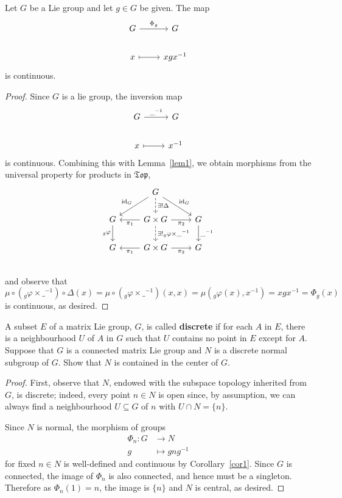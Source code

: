 \documentclass[10pt]{amsart}
\begin{document}
\begin{cor}\label{cor1}
  Let $G$ be a Lie group and let $g \in G$ be given.
  The map
  $$\begin{tikzcd}
    G \arrow{r}{\Phi_g} &G\\
    x \arrow[mapsto]{r}& xgx^{-1}
  \end{tikzcd}$$
  is continuous.

  \begin{proof}
    Since $G$ is a lie group, the inversion map
    $$\begin{tikzcd}
      G \arrow{r}{\_^{-1}} &G\\
      x \arrow[mapsto]{r} & x^{-1} 
    \end{tikzcd}$$
    is continuous.
    Combining this with Lemma~\ref{lem1}, we obtain morphisms from the universal property for products in $\mathfrak{Top}$,
    $$\begin{tikzcd}
      & G\arrow[swap]{ld}{\operatorname{id}_G}\arrow{rd}{\operatorname{id}_G}\arrow[dashed]{d}{\exists !\Delta}\\
      G\arrow[swap]{d}{_g\varphi} & \arrow{l}{\pi_1} G \times G \arrow[dashed]{d}{\exists !_g\varphi \times \_^{-1}} \arrow[swap]{r}{\pi_2} & G\arrow{d}{\_^{-1}}\\
      G & \arrow{l}{\pi_1} G \times G \arrow[swap]{r}{\pi_2} & G\\
    \end{tikzcd}$$
    and observe that 
    $$\mu \circ \left(_g\varphi \times \_^{-1}\right) \circ \Delta(x)
    = \mu \circ \left(_g\varphi \times \_^{-1}\right)(x,x)
    = \mu (_g\varphi(x),x^{-1})
    = xgx^{-1}
    = \Phi_g(x)$$
    is continuous, as desired.
  \end{proof}
\end{cor}

\begin{ex}
  A subset $E$ of a matrix Lie group, $G$, is called {\bf discrete} if for each $A$ in $E$, there is a neighbourhood $U$ of $A$ in $G$ such that $U$ contains no point in $E$ except for $A$.
  Suppose that $G$ is a connected matrix Lie group and $N$ is a discrete normal subgroup of $G$.
  Show that $N$ is contained in the center of $G$.
  \begin{proof}
    First, observe that $N$, endowed with the subspace topology inherited from $G$, is discrete; indeed, every point $n \in N$ is open since, by assumption, we can always find a neighbourhood $U \subseteq G$ of $n$ with $U \cap N = \{n\}$.
    
    Since $N$ is normal, the morphism of groups
    \begin{align*}
      \Phi_n \colon G &\rightarrow N\\
      g & \mapsto gng^{-1}
    \end{align*}  
    for fixed $n \in N$ is well-defined and continuous by Corollary~\ref{cor1}.
    Since $G$ is connected, the image of $\Phi_n$ is also connected, and hence must be a singleton.
    Therefore as $\Phi_n(1) = n$, the image is $\{n\}$ and $N$ is central, as desired.
  \end{proof}
\end{ex}
\end{document}

